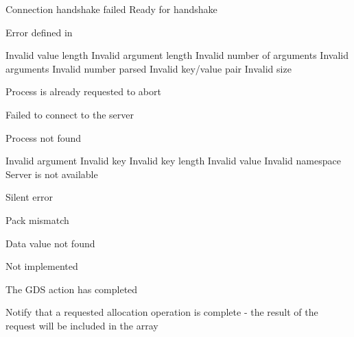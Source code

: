 \begin{constantdesc}

%
Connection handshake failed
%
Ready for handshake

%
Error defined in 

%
Invalid value length
%
Invalid argument length
%
Invalid number of arguments
%
Invalid arguments
%
Invalid number parsed
%
Invalid key/value pair
%
Invalid size

%
Process is already requested to abort

%
Failed to connect to the server

%
Process not found

%
Invalid argument
%
Invalid key
%
Invalid key length
%
Invalid value
%
Invalid namespace
%
Server is not available

%
Silent error

%
Pack mismatch

%
Data value not found

%
Not implemented

%
The \ac{GDS} action has completed

Notify that a requested allocation operation is complete - the result of
the request will be included in the  array

\end{constantdesc}

